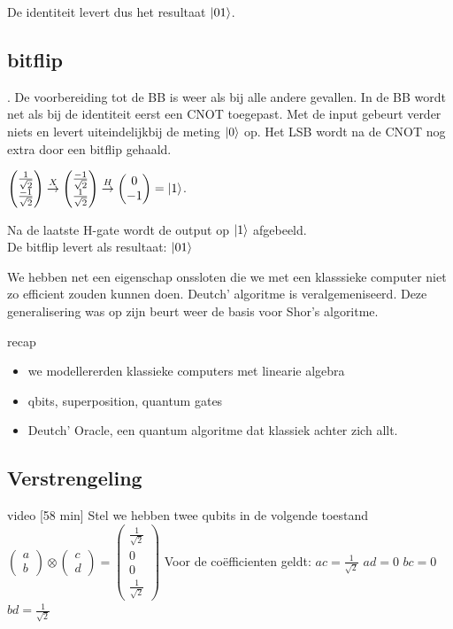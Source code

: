 \documentclass[../../main.tex]{subfiles}
\begin{document}
De identiteit levert dus het resultaat $\ket{01}$.

\subsection*{bitflip}.
De voorbereiding tot de BB is weer als bij alle andere gevallen. In de BB wordt net als bij de identiteit eerst een CNOT toegepast. Met de input gebeurt verder niets en levert uiteindelijkbij de meting $\ket{0}$ op. 
Het LSB wordt na de CNOT nog extra door een bitflip gehaald.

$\begin{pmatrix} \tfrac{1}{\sqrt{2}}  \\ \tfrac{-1}{\sqrt{2}} \end{pmatrix}
\overset{X}{\rightarrow}
\begin{pmatrix} \tfrac{-1}{\sqrt{2}}  \\ \tfrac{1}{\sqrt{2}} \end{pmatrix}
\overset{H}{\rightarrow}
\begin{pmatrix} 0  \\ -1 \end{pmatrix}=\ket{1}
$.

Na de laatste H-gate wordt de output op $\ket{1}$ afgebeeld.\\
De bitflip levert als resultaat: $\ket{01}$

We hebben net een eigenschap onssloten die we met een klasssieke computer niet zo efficient zouden kunnen doen. 
Deutch' algoritme is veralgemeniseerd. Deze generalisering was op zijn beurt weer de basis voor Shor's algoritme. 


recap

\begin{itemize}[noitemsep]
\item we modellererden klassieke computers met linearie algebra
\item qbits, superposition, quantum gates
\item Deutch' Oracle, een quantum algoritme dat klassiek achter zich allt.
\end{itemize}

\subsection*{Verstrengeling}
video [58 min]
Stel we hebben twee qubits in de volgende toestand\\
$
\begin{pmatrix}
a  \\ 
b
\end{pmatrix}
\otimes
\begin{pmatrix}
c  \\ 
d
\end{pmatrix}
=
\begin{pmatrix} \tfrac{1}{\sqrt{2}}  \\ 
0 \\
0\\
\tfrac{1}{\sqrt{2}} 
\end{pmatrix}
$
Voor de co\"efficienten geldt:
$ac=\tfrac{1}{\sqrt{2}}$
$ad=0$
$bc=0$
$bd=\tfrac{1}{\sqrt{2}}$
\end{document}
